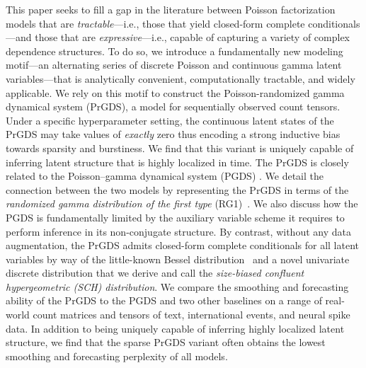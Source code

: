 \documentclass{article}
\begin{document}
This paper seeks to fill a gap in the literature between Poisson factorization models that are \emph{tractable}---i.e., those that yield closed-form complete conditionals---and those that are \emph{expressive}---i.e., capable of capturing a variety of complex dependence structures. To do so, we introduce a fundamentally new modeling motif---an alternating series of discrete Poisson and continuous gamma latent variables---that is analytically convenient, computationally tractable, and widely applicable. We rely on this motif to construct the Poisson-randomized gamma dynamical system (PrGDS), a model for sequentially observed count tensors. Under a specific hyperparameter setting, the continuous latent states of the PrGDS may take values of \emph{exactly} zero thus encoding a strong inductive bias towards sparsity and burstiness. We find that this variant is uniquely capable of inferring latent structure that is highly localized in time. The PrGDS is closely related to the Poisson--gamma dynamical system (PGDS) \cite{schein2016poisson}. We detail the connection between the two models by representing the PrGDS in terms of the \emph{randomized gamma distribution of the first type} (RG1)~\cite{yuan2000bessel,makarov2010exact}. We also discuss how the PGDS is fundamentally limited by the auxiliary variable scheme it requires to perform inference in its non-conjugate structure. By contrast, without any data augmentation, the PrGDS admits closed-form complete conditionals for all latent variables by way of the little-known Bessel distribution~\cite{yuan2000bessel} and a novel univariate discrete distribution that we derive and call the \emph{size-biased confluent hypergeometric (SCH) distribution}. We compare the smoothing and forecasting ability of the PrGDS to the PGDS and two other baselines on a range of real-world count matrices and tensors of text, international events, and neural spike data. In addition to being uniquely capable of inferring highly localized latent structure, we find that the sparse PrGDS variant often obtains the lowest smoothing and forecasting perplexity of all models.~

\end{document}
